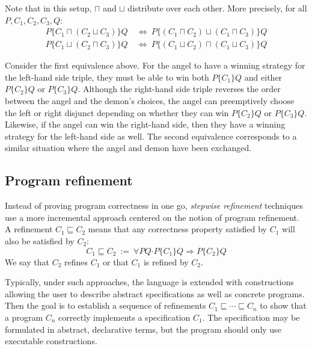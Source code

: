 \documentclass[11pt,oneside]{book}
\theoremstyle{definition}
\newcommand{\bdot}{\boldsymbol{\cdot}}
\newcommand{\htr}[3]{{ {#1} \lbrace {#2} \rbrace {#3} }}
\begin{document}
Note that in this setup,
$\sqcap$ and $\sqcup$ distribute over each other.
More precisely, for all $P, C_1, C_2, C_3, Q$:
\begin{align*}
  \htr{P}{C_1 \sqcap (C_2 \sqcup C_3)}{Q} \: &\Leftrightarrow \:
    \htr{P}{(C_1 \sqcap C_2) \sqcup (C_1 \sqcap C_3)}{Q} \\
  \htr{P}{C_1 \sqcup (C_2 \sqcap C_3)}{Q} \: &\Leftrightarrow \:
    \htr{P}{(C_1 \sqcup C_2) \sqcap (C_1 \sqcup C_3)}{Q}
\end{align*}

Consider the first equivalence above.
For the angel to have a winning strategy for
the left-hand side triple,
they must be able to win both $\htr{P}{C_1}{Q}$
and either $\htr{P}{C_2}{Q}$ or $\htr{P}{C_3}{Q}$.
Although the right-hand side triple
reverses the order between the angel and the demon's choices,
the angel can preemptively choose the left or right
disjunct depending on whether they can win
$\htr{P}{C_2}{Q}$ or $\htr{P}{C_3}{Q}$.
Likewise, if the angel can win the right-hand side,
then they have a winning strategy for the left-hand side as well.
The second equivalence corresponds to a similar situation
where the angel and demon have been exchanged.


\subsection{Program refinement} %

Instead of proving program correctness in one go,
\emph{stepwise refinement} techniques use a more incremental approach
centered on the notion of program refinement.
A refinement $C_1 \sqsubseteq C_2$
means that any correctness property satisfied by $C_1$
will also be satisfied by $C_2$:
\[
    C_1 \sqsubseteq C_2 \: := \:
    \forall P Q \bdot
      \htr{P}{C_1}{Q} \Rightarrow
      \htr{P}{C_2}{Q}
\]
We say that $C_2$ refines $C_1$
or that $C_1$ is refined by $C_2$.

Typically,
under such approaches,
the language is extended with constructions
allowing the user to describe
abstract specifications as well as
concrete programs.
Then the goal is to establish
a sequence of refinements
$C_1 \sqsubseteq \cdots \sqsubseteq C_n$
to show that a program $C_n$
correctly implements a specification $C_1$.
The specification may be formulated in
abstract, declarative terms,
but the program should only use executable constructions.
\end{document}
